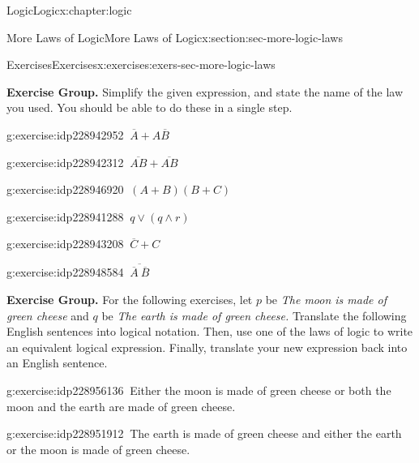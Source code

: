 \documentclass[twoside,10pt,]{book}
\numberwithin{equation}{section}
\begin{document}
\begin{chapterptx}{Logic}{}{Logic}{}{}{x:chapter:logic}
\begin{sectionptx}{More Laws of Logic}{}{More Laws of Logic}{}{}{x:section:sec-more-logic-laws}
\begin{exercises-subsection}{Exercises}{}{Exercises}{}{}{x:exercises:exers-sec-more-logic-laws}
\par\medskip\noindent%
\textbf{Exercise Group.}\space\space%
Simplify the given expression, and state the name of the law you used.  You should be able to do these in a single step.\begin{exercisegroup}
\begin{divisionexerciseeg}{15}{}{}{g:exercise:idp228942952}%
\(\ \overline{A}{}+ A\overline{B}{}\)\end{divisionexerciseeg}%
\begin{divisionexerciseeg}{16}{}{}{g:exercise:idp228942312}%
\(\ \overline{AB} + \overline{AB}\)\end{divisionexerciseeg}%
\begin{divisionexerciseeg}{17}{}{}{g:exercise:idp228946920}%
\(\ (A+B)(B+C)\)\end{divisionexerciseeg}%
\begin{divisionexerciseeg}{18}{}{}{g:exercise:idp228941288}%
\(\ q {\vee}{}(q {\wedge}{} r)\)\end{divisionexerciseeg}%
\begin{divisionexerciseeg}{19}{}{}{g:exercise:idp228943208}%
\(\ \overline{C}{} + C\)\end{divisionexerciseeg}%
\begin{divisionexerciseeg}{20}{}{}{g:exercise:idp228948584}%
\(\ \overline{\overline{A}{} ~ \overline{B}{}}\)\end{divisionexerciseeg}%
\end{exercisegroup}
\par\medskip\noindent
\par\medskip\noindent%
\textbf{Exercise Group.}\space\space%
For the following exercises, let \(p\) be \emph{The moon is made of green cheese} and \(q\) be \emph{The earth is made of green cheese.}  Translate the following English sentences into logical notation.  Then, use one of the laws of logic to write an equivalent logical expression.  Finally, translate your new expression back into an English sentence.\begin{exercisegroup}
\begin{divisionexerciseeg}{21}{}{}{g:exercise:idp228956136}%
\(\ \)Either the moon is made of green cheese or both the moon and the earth are made of green cheese.\end{divisionexerciseeg}%
\begin{divisionexerciseeg}{22}{}{}{g:exercise:idp228951912}%
\(\ \)The earth is made of green cheese and either the earth or the moon is made of green cheese.\end{divisionexerciseeg}%

\end{exercisegroup}
\end{exercises-subsection}
\end{sectionptx}
\end{chapterptx}
\end{document}
